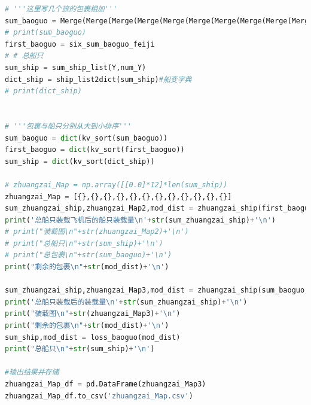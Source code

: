 \documentclass{whutmod}
\begin{document}
\begin{lstlisting}[language=python]
# '''这里写几个旅的包裹相加'''
sum_baoguo = Merge(Merge(Merge(Merge(Merge(Merge(Merge(Merge(Merge(Merge(one_sum_baoguo,two_sum_baoguo),three_sum_baoguo),four_sum_baoguo),five_sum_baoguo),seven_sum_baoguo),eight_sum_baoguo),night_sum_baoguo),ten_sum_baoguo),elevn_sum_baoguo),twelve_sum_baoguo)# +.........
# print(sum_baoguo)
first_baoguo = six_sum_baoguo_feiji
# # 总船只
sum_ship = sum_ship_list(Y,num_Y)
dict_ship = ship_list2dict(sum_ship)#船变字典
# print(dict_ship)


# '''包裹与船只分别从大到小排序'''
sum_baoguo = dict(kv_sort(sum_baoguo))
first_baoguo = dict(kv_sort(first_baoguo))
sum_ship = dict(kv_sort(dict_ship))

# zhuangzai_Map = np.array([[0.0]*12]*len(sum_ship))
zhuangzai_Map = [{},{},{},{},{},{},{},{},{},{},{},{}]
sum_zhuangzai_ship,zhuangzai_Map2,mod_dist = zhuangzai_ship(first_baoguo,sum_ship,zhuangzai_Map)
print('总船只装载飞机后的船只装载量\n'+str(sum_zhuangzai_ship)+'\n')
# print("装载图\n"+str(zhuangzai_Map2)+'\n')
# print("总船只\n"+str(sum_ship)+'\n')
# print("总包裹\n"+str(sum_baoguo)+'\n')
print("剩余的包裹\n"+str(mod_dist)+'\n')

sum_zhuangzai_ship,zhuangzai_Map3,mod_dist = zhuangzai_ship(sum_baoguo,sum_zhuangzai_ship,zhuangzai_Map2)
print('总船只装载后的装载量\n'+str(sum_zhuangzai_ship)+'\n')
print("装载图\n"+str(zhuangzai_Map3)+'\n')
print("剩余的包裹\n"+str(mod_dist)+'\n')
sum_ship,mod_dist = loss_baoguo(mod_dist)
print("总船只\n"+str(sum_ship)+'\n')

#输出结果并存储
zhuangzai_Map_df = pd.DataFrame(zhuangzai_Map3)
zhuangzai_Map_df.to_csv('zhuangzai_Map.csv')
\end{lstlisting}
\end{document}
